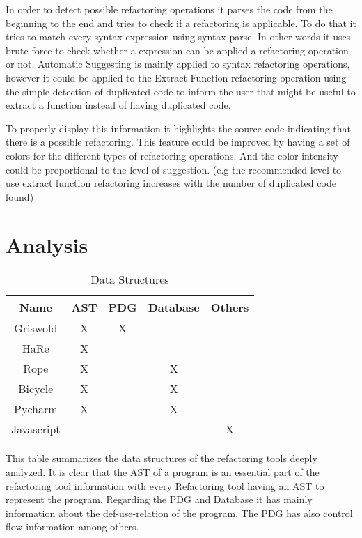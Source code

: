 In order to detect possible refactoring operations it parses the code from the
beginning to the end and tries to check if a refactoring is applicable.
To do that it tries to match every syntax expression using syntax parse.
In other words it uses brute force to check whether a expression can be applied
a refactoring operation or not.
Automatic Suggesting is mainly applied to syntax refactoring operations, however
it could be applied to the Extract-Function refactoring operation using the
simple detection of duplicated code to inform the user that might be useful
to extract a function instead of having duplicated code. %

To properly display this information it highlights the source-code indicating
that there is a possible refactoring.
This feature could be improved by having a set of colors for the different types
of refactoring operations. And the color intensity could be proportional to the level
of suggestion. (e.g the recommended level to use extract function refactoring
increases with the number of duplicated code found) %


\section{Analysis}
\begin{table}[]
\centering
\caption{Data Structures}
\label{my-label}
\begin{tabular}{c|c|c|c|c}
Name       & AST & PDG & Database & Others \\ \hline
Griswold   & X   & X   &          &        \\ \hline
HaRe       & X   &     &          &        \\ \hline
Rope       & X   &     & X        &        \\ \hline
Bicycle    & X   &     & X        &        \\ \hline
Pycharm    & X   &     & X        &        \\ \hline
Javascript &     &     &          & X
\end{tabular}
\end{table}

This table summarizes the data structures of the refactoring tools deeply analyzed.
It is clear that the AST of a program is an essential part of the refactoring
tool information with every Refactoring tool having an AST to represent the program.
Regarding the PDG and Database it has mainly information about the def-use-relation
of the program. The PDG has also control flow information among others.

